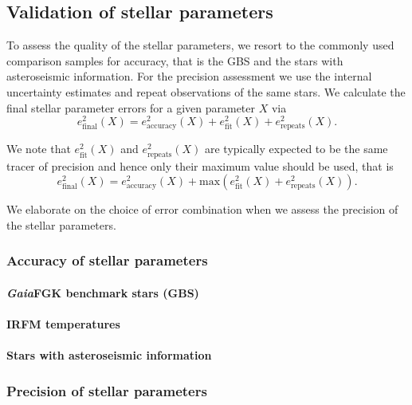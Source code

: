 \documentclass[fleqn,usenatbib,useAMS]{mnras}
\newcommand{\Gaia}{\textit{Gaia}}
\begin{document}
\subsection{Validation of stellar parameters} \label{sec:validation_sp}

To assess the quality of the stellar parameters, we resort to the commonly used comparison samples for accuracy, that is the GBS and the stars with asteroseismic information. For the precision assessment we use the internal uncertainty estimates and repeat observations of the same stars.  We calculate the final stellar parameter errors for a given parameter $X$ via 
\begin{equation}
e_\text{final}^2 (X) = e_\text{accuracy}^2(X) + e_\text{fit}^2(X) + e_\text{repeats}^2(X). \label{eq:final_error}
\end{equation}

We note that $e_\text{fit}^2(X)$ and $e_\text{repeats}^2(X)$ are typically expected to be the same tracer of precision and hence only their maximum value should be used, that is
\begin{equation}
e_\text{final}^2 (X) = e_\text{accuracy}^2(X) + \text{max} \left(e_\text{fit}^2(X) + e_\text{repeats}^2(X) \right).
\end{equation}

We elaborate on the choice of error combination when we assess the precision of the stellar parameters.

\subsubsection{Accuracy of stellar parameters}

\paragraph*{\Gaia FGK benchmark stars (GBS)}

\paragraph*{IRFM temperatures}

\paragraph*{Stars with asteroseismic information}

\subsubsection{Precision of stellar parameters}
\end{document}
